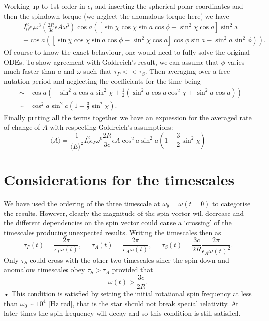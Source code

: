 Working up to 1st order in $\epsilon_{I}$ and inserting the spherical polar
coordinates and then the spindown torque (we neglect the anomalous torque here)
we have
\begin{eqnarray*}
&=& I_{0}^{2}\epsilon_{I}\omega^{3}
    \left(\frac{2R}{3c}\epsilon{A}\omega^{3}\right)
    \cos a \left([\sin \chi \cos \chi \sin a \cos \phi 
                 - \sin^{2}\chi \cos a]\sin^{2} a \right. \\
&& \left.- \cos a ([\sin \chi \cos \chi \sin a \cos \phi 
                   - \sin^{2}\chi \cos a]\cos \phi \sin a 
                   - \sin^{2}a \sin^{2}\phi)\right).
\end{eqnarray*}
Of course to know the exact behaviour, one would need to fully solve the
original ODEs. To show agreement with Goldreich's result, we can assume that
$\phi$ varies much faster than $a$ and $\omega$ such that $\tau_{P}<<\tau_{S}$.
Then averaging over a free nutation period and neglecting the coefficients for
the time being
\begin{eqnarray*}
&\sim& \cos a \left(-\sin^{2}a\cos a \sin^{2}\chi + 
       \frac{1}{2}\left(\sin^{2}a\cos a \cos^{2}\chi + 
       \sin^{2}a \cos a \right) \right) \\
& \sim& \cos^{2} a \sin^{2}a\left(1-\frac{3}{2}\sin^{2}\chi\right).
\end{eqnarray*}
Finally putting all the terms together we have an expression for the averaged
rate of change of $A$ with respecting Goldreich's assumptions:
\begin{equation}
\langle \dot{A} \rangle =\frac{1}{\langle E\rangle ^{2}}I_{0}^{2}
                         \epsilon_{I}\omega^{6}\frac{2R}{3c}\epsilon{A} 
                         \cos^{2} a \sin^{2}a
                         \left(1-\frac{3}{2}\sin^{2}\chi\right) 
\end{equation}

\section{Considerations for the timescales}\label{sec: timescales}
We have used the ordering of the three timescale at $\omega_{0}=\omega(t=0)$
to categorise the results. However, clearly the magnitude of the spin vector
will decrease and the different dependencies on the spin vector could cause a
`crossing' of the timescales producing unexpected results. Writing the
timescales then as 
\begin{equation}
\tau_{P}(t)=\frac{2\pi}{\epsilon_{I}\omega(t)}, \;\;\;\;\; 
\tau_{A}(t)=\frac{2\pi}{\epsilon_{A}\omega(t)},  \;\;\;\;\; 
\tau_{S}(t)=\frac{3c}{2R}\frac{2\pi}{\epsilon_{A}\omega(t)^{2}}.
\end{equation}
Only $\tau_{S}$ could cross with the other two timescales since the spin down
and anomalous timescales obey $\tau_{S}>\tau_{A}$ provided that 
\begin{equation*}
\omega(t)>\frac{3c}{2R}.
\end{equation*}•
This condition is satisfied by setting the initial rotational spin frequency at
less than $\omega_{0} \sim 10^{4}$ [Hz rad], that is the star should not break
special relativity. At later times the spin frequency will decay and so this
condition is still satisfied.

